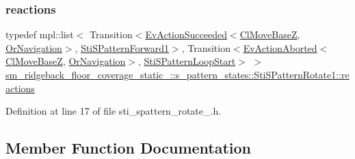 \subsubsection{\texorpdfstring{reactions}{reactions}}
{\footnotesize\ttfamily typedef mpl\+::list$<$ Transition$<$\hyperlink{structsmacc_1_1default__events_1_1EvActionSucceeded}{Ev\+Action\+Succeeded}$<$\hyperlink{classcl__move__base__z_1_1ClMoveBaseZ}{Cl\+Move\+BaseZ}, \hyperlink{classsm__ridgeback__floor__coverage__static__1_1_1OrNavigation}{Or\+Navigation}$>$, \hyperlink{structsm__ridgeback__floor__coverage__static__1_1_1s__pattern__states_1_1StiSPatternForward1}{Sti\+S\+Pattern\+Forward1}$>$, Transition$<$\hyperlink{structsmacc_1_1default__events_1_1EvActionAborted}{Ev\+Action\+Aborted}$<$\hyperlink{classcl__move__base__z_1_1ClMoveBaseZ}{Cl\+Move\+BaseZ}, \hyperlink{classsm__ridgeback__floor__coverage__static__1_1_1OrNavigation}{Or\+Navigation}$>$, \hyperlink{structsm__ridgeback__floor__coverage__static__1_1_1s__pattern__states_1_1StiSPatternLoopStart}{Sti\+S\+Pattern\+Loop\+Start}$>$ $>$ \hyperlink{structsm__ridgeback__floor__coverage__static__1_1_1s__pattern__states_1_1StiSPatternRotate1_aa472ba623b51853ad10f46786e874c4b}{sm\+\_\+ridgeback\+\_\+floor\+\_\+coverage\+\_\+static\+\_\+::s\+\_\+pattern\+\_\+states\+::\+Sti\+S\+Pattern\+Rotate1\+::reactions}}



Definition at line 17 of file sti\+\_\+spattern\+\_\+rotate\+\_.\+h.



\subsection{Member Function Documentation}
\mbox{\label{structsm__ridgeback__floor__coverage__static__1_1_1s__pattern__states_1_1StiSPatternRotate1_a3c7eaf8c293ee615b322d8cc27e48951}} 
